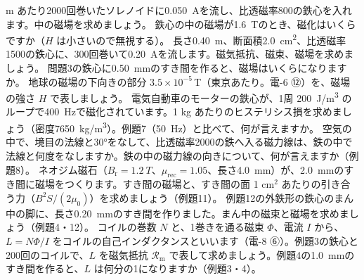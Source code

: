 \bkendproblems
{}
 m あたり2000回巻いたソレノイドに\qty{0.050}{A}を流し、比透磁率800の鉄心を入れます。中の磁場を求めましょう。
\bkproblem 鉄心の中の磁場が\qty{1.6}{T}のとき、磁化はいくらですか（$H$ は小さいので無視する）。
\bkproblem 長さ\qty{0.40}{m}、断面積\qty{2.0}{cm^2}、比透磁率1500の鉄心に、300回巻いて\qty{0.20}{A}を流します。磁気抵抗、磁束、磁場を求めましょう。
\bkproblem 問題3の鉄心に\qty{0.50}{mm}のすき間を作ると、磁場はいくらになりますか。
\bkproblem 地球の磁場の下向きの部分 $3.5\times10^{-5}$\,T（東京あたり。電-6 ⑫）を、磁場の強さ $H$ で表しましょう。
\bkproblem 電気自動車のモーターの鉄心が、1周 \qty{200}{J/m^3} のループで\qty{400}{Hz}で磁化されています。1 kg あたりのヒステリシス損を求めましょう（密度\qty{7650}{kg/m^3}）。例題7（\qty{50}{Hz}）と比べて、何が言えますか。
\bkproblem 空気の中で、境目の法線と30°をなして、比透磁率2000の鉄へ入る磁力線は、鉄の中で法線と何度をなしますか。鉄の中の磁力線の向きについて、何が言えますか（例題8）。
\bkproblem ネオジム磁石（$B_{\mathrm r}=\qty{1.2}{T}$、$\mu_{\mathrm{rec}}=1.05$、長さ\qty{4.0}{mm}）が、\qty{2.0}{mm}のすき間に磁場をつくります。すき間の磁場と、すき間の面 1 cm$^2$ あたりの引き合う力（$B^2S/(2\mu_0)$）を求めましょう（例題11）。
\bkproblem 例題12の外鉄形の鉄心のまん中の脚に、長さ\qty{0.20}{mm}のすき間を作りました。まん中の磁束と磁場を求めましょう（例題4・12）。
\bkproblem コイルの巻数 $N$ と、1巻きを通る磁束 $\Phi$、電流 $I$ から、$L=N\Phi/I$ をコイルの自己インダクタンスといいます（電-8 ⑥）。例題3の鉄心と200回のコイルで、$L$ を磁気抵抗 $\mathcal R_{\mathrm m}$ で表して求めましょう。例題4の\qty{1.0}{mm}のすき間を作ると、$L$ は何分の1になりますか（例題3・4）。
